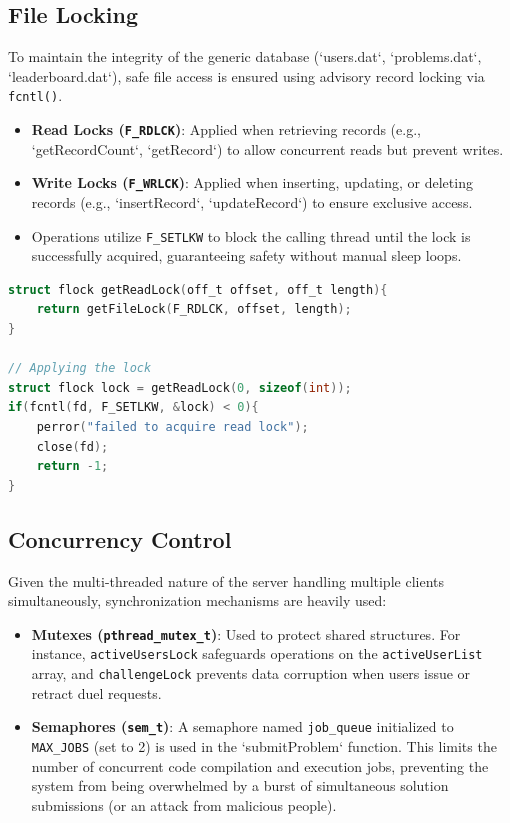 \documentclass[12pt,a4paper]{article}
\begin{document}
\subsection{File Locking}
To maintain the integrity of the generic database (`users.dat`, `problems.dat`, `leaderboard.dat`), safe file access is ensured using advisory record locking via \texttt{fcntl()}.
\begin{itemize}
    \item \textbf{Read Locks (\texttt{F\_RDLCK})}: Applied when retrieving records (e.g., `getRecordCount`, `getRecord`) to allow concurrent reads but prevent writes.
    \item \textbf{Write Locks (\texttt{F\_WRLCK})}: Applied when inserting, updating, or deleting records (e.g., `insertRecord`, `updateRecord`) to ensure exclusive access.
    \item Operations utilize \texttt{F\_SETLKW} to block the calling thread until the lock is successfully acquired, guaranteeing safety without manual sleep loops.
\end{itemize}

\begin{lstlisting}[language=C, caption=File Locking Implementation]
struct flock getReadLock(off_t offset, off_t length){
    return getFileLock(F_RDLCK, offset, length);
}

// Applying the lock
struct flock lock = getReadLock(0, sizeof(int));
if(fcntl(fd, F_SETLKW, &lock) < 0){
    perror("failed to acquire read lock");
    close(fd);
    return -1;
}
\end{lstlisting}

\subsection{Concurrency Control}
Given the multi-threaded nature of the server handling multiple clients simultaneously, synchronization mechanisms are heavily used:
\begin{itemize}
    \item \textbf{Mutexes (\texttt{pthread\_mutex\_t})}: Used to protect shared structures. For instance, \texttt{activeUsersLock} safeguards operations on the \texttt{activeUserList} array, and \texttt{challengeLock} prevents data corruption when users issue or retract duel requests.
    \item \textbf{Semaphores (\texttt{sem\_t})}: A semaphore named \texttt{job\_queue} initialized to \texttt{MAX\_JOBS} (set to 2) is used in the `submitProblem` function. This limits the number of concurrent code compilation and execution jobs, preventing the system from being overwhelmed by a burst of simultaneous solution submissions (or an attack from malicious people).
\end{itemize}
\end{document}
